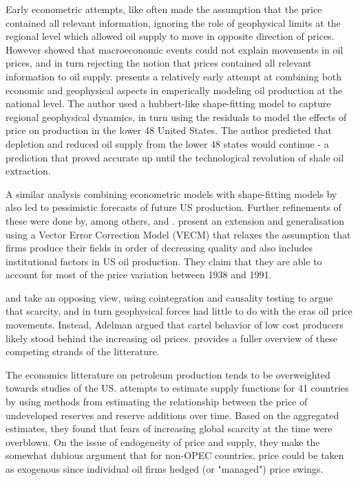 \documentclass[12pt]{article}
\begin{document}
Early econometric attempts, like \citet{adelman_fea_1975} often made the assumption that the price contained all relevant information, ignoring the role of geophysical limits at the regional level which allowed oil supply to move in opposite direction of prices. However \citet{hamilton_oil_1983} showed that macroeconomic events could not explain movements in oil prices, and in turn rejecting the notion that prices contained all relevant information to oil supply. \citet{kaufmann_oil_1991} presents a relatively early attempt at combining both economic and geophysical aspects in emperically modeling oil production at the national level. The author used a hubbert-like \citep{hubbert_energy_1962} shape-fitting model to capture regional geophysical dynamics, in turn using the residuals to model the effects of price on production in the lower 48 United States. The author predicted that depletion and reduced oil supply from the lower 48 states would continue - a prediction that proved accurate up until the technological revolution of shale oil extraction. 

A similar analysis combining econometric models with shape-fitting models by \citet{cleveland_forecasting_1991} also led to pessimistic forecasts of future US production. Further refinements of these were done by, among others, \citet{pesaran_forecasting_1995}  and \citet{moroney_integrated_1999}. \citet{kaufmann_oil_2001} present an extension and generalisation using a Vector Error Correction Model (VECM) that relaxes the assumption that firms produce their fields in order of decreasing quality and also includes institutional factors in US oil production. They claim that they are able to account for most of the price variation between 1938 and 1991.

\citet{adelman_mineral_1990} and \citet{adelman_modelling_1993} take an opposing view, using cointegration and causality testing to argue that scarcity, and in turn geophysical forces had little to do with the eras oil price movements. Instead, Adelman argued that cartel behavior of low cost producers likely stood behind the increasing oil prices. \citet{lynch_forecasting_2002} provides a fuller overview of these competing strands of the litterature. 

The economics litterature on petroleum production tends to be overweighted towards studies of the US. \citet{watkins_world_1998} attempts to estimate supply functions for 41 countries by using methods from estimating the relationship between the price of undeveloped reserves and reserve additions over time. Based on the aggregated estimates, they found that fears of increasing global scarcity at the time were overblown. On the issue of endogeneity of price and supply, they make the somewhat dubious argument that for non-OPEC countries, price could be taken as exogenous since individual oil firms hedged (or "managed") price swings. 
\end{document}
